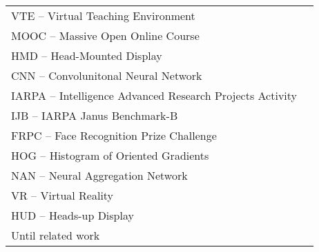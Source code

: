 
\begin{thenotations}
\renewcommand{\arraystretch}{1.5}
  \noindent
  \begin{tabular}{ll}

VTE -- Virtual Teaching Environment\\
MOOC -- Massive Open Online Course\\
HMD -- Head-Mounted Display\\
CNN -- Convolunitonal Neural Network\\
IARPA -- Intelligence Advanced Research Projects Activity\\
IJB -- IARPA Janus Benchmark-B\\
FRPC -- Face Recognition Prize Challenge\\
HOG -- Histogram of Oriented Gradients\\
NAN -- Neural Aggregation Network\\
VR -- Virtual Reality\\
HUD -- Heads-up Display\\

Until related work

  \end{tabular}

\end{thenotations}